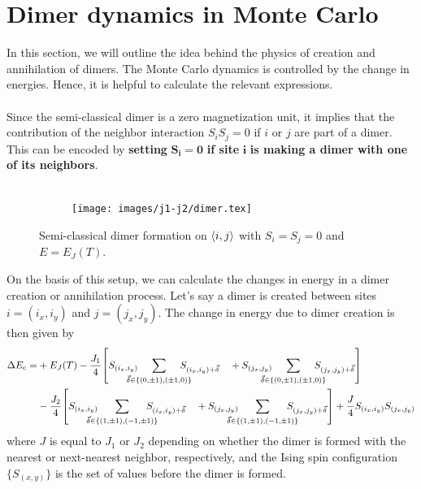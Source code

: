 \documentclass[../thesis_main.tex]{subfiles}
\begin{document}
\section{Dimer dynamics in Monte Carlo} %
In this section, we will outline the idea behind the physics of creation and annihilation of dimers. The Monte Carlo dynamics is controlled by the change in energies. Hence, it is helpful to calculate the relevant expressions.~\\~\\
Since the semi-classical dimer is a zero magnetization unit, it implies that the contribution of the neighbor interaction $S_i S_j = 0$ if $i$ or $j$ are part of a dimer. This can be encoded by \textbf{setting} $\boldsymbol{S_i = 0}$ \textbf{if site} $\boldsymbol{i}$ \textbf{is making a dimer with one of its neighbors}.~\\~\\
\begin{figure}[t!]
    \centering
    \begin{subfigure}[b]{0.8\textwidth}  %
        \centering
        \texttt{[image: images/j1-j2/dimer.tex]}
    \end{subfigure}
    \caption{Semi-classical dimer formation on $\expval{i, j}$  with $S_i = S_j = 0$ and $E = E_J(T)$.}
    \label{}
\end{figure}
\FloatBarrier \!\!\!\!\!\!\!\!\!\!\!
On the basis of this setup, we can calculate the changes in energy in a dimer creation or annihilation process. Let's say a dimer is created between sites $i = (i_x, i_y)$ and $j = (j_x, j_y)$. The change in energy due to dimer creation is then given by
\begin{align*}
    \Delta E_\text{c} =  & + E_J(T) -\frac{J_1}{4} \qty[S_{(i_x, i_y)} \!\!\!\!\!\!\!\! \sum_{\vec{\delta} \in \{(0,\pm 1), (\pm 1, 0) \}} \!\!\!\!\!\!\!\! S_{(i_x, i_y) + \vec{\delta}} \quad + S_{(j_x, j_y)} \!\!\!\!\!\!\!\! \sum_{\vec{\delta} \in \{(0,\pm 1), (\pm 1, 0) \}} \!\!\!\!\!\!\!\! S_{(j_x, j_y) + \vec{\delta}}] \\
    & -\frac{J_2}{4} \qty[S_{(i_x, i_y)} \!\!\!\!\!\!\!\! \sum_{\vec{\delta} \in \{(1,\pm 1), (-1,\pm 1) \}} \!\!\!\!\!\!\!\! S_{(i_x, i_y) + \vec{\delta}} \quad + S_{(j_x, j_y)} \!\!\!\!\!\!\!\! \sum_{\vec{\delta} \in \{(1,\pm 1), (-1,\pm 1) \}} \!\!\!\!\!\!\!\! S_{(j_x, j_y) + \vec{\delta}}] + \frac{J}{4} S_{(i_x, i_y)} S_{(j_x, j_y)}
\end{align*}
where $J$ is equal to $J_1$ or $J_2$ depending on whether the dimer is formed with the nearest or next-nearest neighbor, respectively, and the Ising spin configuration $\{S_{(x,y)}\}$ is the set of values before the dimer is formed. ~\\~\\
\end{document}

